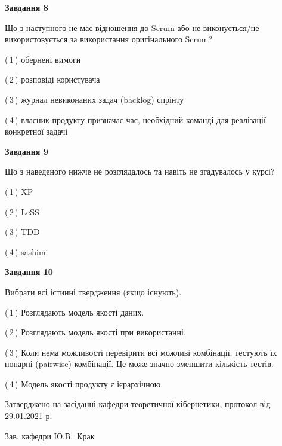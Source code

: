 \documentclass[10pt, ukrainian]{article}
\begin{document}
{\begin {large}
{\begin {center}\textbf{Завдання 8}\end {center}}\par
Що з наступного не має відношення до Scrum або не виконується/не використовується за використання оригінального Scrum?\par
\vspace{2mm}



(\,1\,) обернені вимоги%



(\,2\,) розповіді користувача%



(\,3\,) журнал невиконаних задач (backlog) спрінту%



(\,4\,) власник продукту призначає час, необхідний команді для реалізації конкретної задачі%


{\begin {center}\textbf{Завдання 9}\end {center}}\par
Що з наведеного нижче не розглядалось та навіть не згадувалось у курсі?\par
\vspace{2mm}



(\,1\,) XP%



(\,2\,) LeSS%



(\,3\,) TDD%



(\,4\,) sashimi%


{\begin {center}\textbf{Завдання 10}\end {center}}\par
Вибрати всі істинні твердження (якщо існують).\par
\vspace{2mm}



(\,1\,) Розглядають модель якості даних.%



(\,2\,) Розглядають модель якості при використанні.%



(\,3\,) Коли нема можливості перевірити всі можливі комбінації, тестують їх попарні (pairwise) комбінації. Це може значно зменшити кількість тестів.%



(\,4\,) Модель якості продукту є ієрархічною.%



\end {large}}
{\vspace{5mm}\smallskip \begin {small} Затверджено на засіданні кафедри теоретичної кібернетики, протокол  від   29.01.2021 р.\par\smallskip\smallskip
{\parbox {6.5 cm}{Зав. кафедри \dotfill Ю.В.~Крак}} \end{small}}
\newpage
\end{document}
